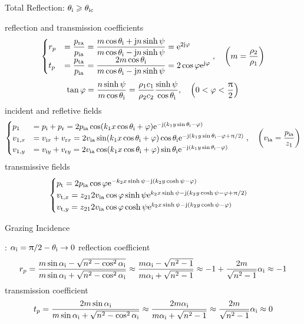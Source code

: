 \documentclass[9pt,mathserif]{beamer}
\let\emph\relax %
\begin{document}
\begin{frame}{Total Reflection: $\theta_\text{i} \geqslant \theta_\text{ic}$}
	\begin{outline}
		\1 reflection and transmission coefficients 
		$$
			\begin{cases}
				r_p & = \dfrac{p\st{ra}}{p\st{ia}} = \dfrac{m\cos \theta \st{i} +
			\mj n \sinh \psi }{m\cos \theta\st{i} - \mj n \sinh \psi} = 
			\me^{2\mj \phi}\\
			t_p&=\dfrac{p\st{ta}}{p\st{ia}} = \dfrac{2m\cos \theta \st{i}}{m\cos 
				\theta\st{i} - \mj n \sinh \psi} = 2\cos\phi \me^{\mj \phi}
			\end{cases}
			\qc \qty(m = \frac{\rho_2}{\rho_1})		
		$$
		$$
		\tan \phi = \frac{n\sinh \psi}{m \cos \theta\st{i}} = 
		\frac{\rho_1c_1}{\rho_2c_2} \frac{\sinh \psi}{\cos \theta\st{i}}
		\qc \qty(0<\phi<\frac{\uppi}{2})$$
		\1 incident and refletive fields
		$$
	\begin{cases}
		p_1&= p\st{i}+p\st{r} = 2p\st{ia}\cos(k_1x\cos\theta\st{i}+\phi)
		\me^{-\mj (k_1y\sin\theta\st{i}-\phi)}\\
		v_{1,x}&= v_{\mi x} + v_{\mathrm{r}x} = 2v\st{ia}\sin
		(k_1x\cos\theta\st{i}+\phi)\cos\theta\st{i}
		\me^{-\mj \qty(k_1y\sin\theta\st{i}-\phi+ \uppi/2)}\\
		v_{1,y}&= v_{\mi y} + v_{\mathrm{r}y} = 2v\st{ia}\cos
		(k_1x\cos\theta\st{i}+\phi)\sin\theta\st{i}
		\me^{-\mj \qty(k_1y\sin\theta\st{i}-\phi)}
	\end{cases}
	\qc \qty(v\st{ia} = \frac{p\st{ia}}{z_1})
$$
	\1 transmissive fields
$$
	\begin{cases}
		p_\text{t} = 2p_\text{ia} \cos \varphi \mathrm{e}^{-k_2x\sinh \psi - \mathrm{j} (k_2 y
		\cosh \psi -\varphi)}\\
		v_{\mathrm{t,}x} = z_{21} 2v_\text{ia} \cos\varphi
		\sinh \psi \mathrm{e}^{k_2x\sinh \psi - \mathrm{j}\qty(k_2y\cosh \psi -\varphi
		+\uppi/2)}\\
		v_{\mathrm{t,}y} = z_{21} 2v_\text{ia} \cos\varphi
		\cosh \psi \mathrm{e}^{k_2x\sinh \psi - \mathrm{j}\qty(k_2y\cosh \psi -\varphi
		)}
	\end{cases}
	$$
	\end{outline}
\end{frame}

\begin{frame}{Grazing Incidence}
	\begin{outline}
		\1 \emph{grazing angle}: $\alpha_\text{i} = \uppi/2 - \theta_\text{i} \to 0$
		\1 reflection coefficient
		$$
		r_p = \frac{m\sin \alpha_\text{i}-\sqrt{n^2-\cos^2\alpha_\text{i}}}{
		m\sin \alpha_\text{i}+\sqrt{n^2-\cos^2\alpha_\text{i}}}
		\approx
		\frac{m\alpha_\text{i}-\sqrt{n^2-1}}{m\alpha_\text{i}+\sqrt{n^2-1}}
		\approx -1 +\frac{2m}{\sqrt{n^2-1}} \alpha_\text{i}\approx -1
		$$
		\1 transmission coefficient
		$$
		t_p = \frac{2m\sin \alpha_\text{i}}{
		m\sin \alpha_\text{i}+\sqrt{n^2-\cos^2\alpha_\text{i}}}
		\approx
		\frac{2m\alpha_\text{i}}{m\alpha_\text{i}+\sqrt{n^2-1}}
		\approx \frac{2m}{\sqrt{n^2-1}} \alpha_\text{i}\approx 0
		$$
	\end{outline}
\end{frame}
\end{document}
